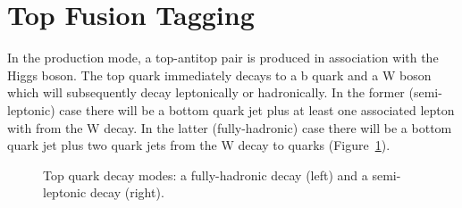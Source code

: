 \section{Top Fusion Tagging}
In the \ttH production mode, a top-antitop pair is produced in association with the Higgs boson. The top quark immediately decays to a b quark and a W boson which will subsequently decay leptonically or hadronically. In the former (semi-leptonic) case there will be a bottom quark jet plus at least one associated lepton with \MET from the W decay. In the latter (fully-hadronic) case there will be a bottom quark jet plus two quark jets from the W decay to quarks (Figure~\ref{fig:event_categorisaton:top_decays}). 
\begin{figure}[h!]
    \begin{center}
        \qquad
    \end{center}
    \caption{Top quark decay modes: a fully-hadronic decay (left) and a semi-leptonic decay (right).}
    \label{fig:event_categorisaton:top_decays}
\end{figure}

